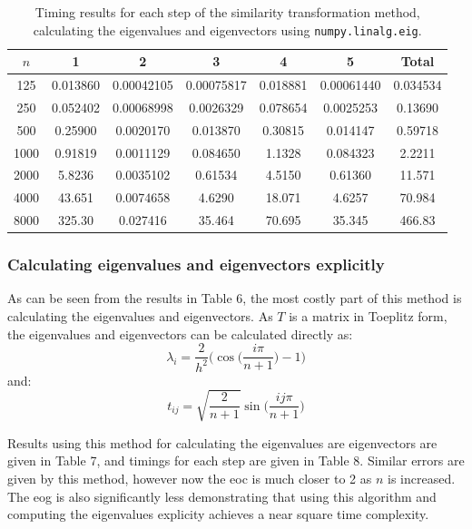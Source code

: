 \documentclass{article}
\numberwithin{equation}{section}
\begin{document}
\begin{table}[H]
\centering
\begin{tabular}{|c|c|c|c|c|c|c|}
\hline
$n$ & 1 & 2 & 3 & 4 & 5 & Total \\
\hline
125 & 0.013860 & 0.00042105 & 0.00075817 & 0.018881 & 0.00061440 & 0.034534 \\
250 & 0.052402 & 0.00068998 & 0.0026329 & 0.078654 & 0.0025253 & 0.13690 \\
500 & 0.25900 & 0.0020170 & 0.013870 & 0.30815 & 0.014147 & 0.59718 \\
1000 & 0.91819 & 0.0011129 & 0.084650 & 1.1328 & 0.084323 & 2.2211 \\
2000 & 5.8236 & 0.0035102 & 0.61534 & 4.5150 & 0.61360 & 11.571 \\
4000 & 43.651 & 0.0074658 & 4.6290 & 18.071 & 4.6257 & 70.984 \\
8000 & 325.30 & 0.027416 & 35.464 & 70.695 & 35.345 & 466.83 \\
\hline
\end{tabular}
\captionsetup{justification=centering}
\caption{Timing results for each step of the similarity transformation method, calculating the eigenvalues and eigenvectors using \texttt{numpy.linalg.eig}.}
\end{table}

\subsubsection*{Calculating eigenvalues and eigenvectors explicitly}

As can be seen from the results in Table 6, the most costly part of this method is calculating the eigenvalues and eigenvectors. As $T$ is a matrix in Toeplitz form, the eigenvalues and eigenvectors can be calculated directly as:
\[ \lambda_i = \frac{2}{h^2} \Big( \cos \Big( \frac{i \pi}{n+1} \Big) - 1 \Big) \]
and:
\[ t_{ij} = \sqrt{\frac{2}{n+1}} \sin \Big( \frac{ij \pi}{n+1}  \Big) \]

Results using this method for calculating the eigenvalues are eigenvectors are given in Table 7, and timings for each step are given in Table 8. Similar errors are given by this method, however now the eoc is much closer to 2 as $n$ is increased. The eog is also significantly less demonstrating that using this algorithm and computing the eigenvalues explicity achieves a near square time complexity. 
\end{document}
